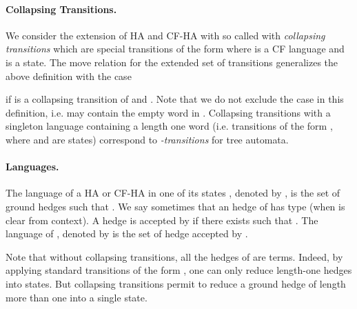 \documentclass[a4paper]{article}
\theoremstyle{plain}
\begin{document}
\paragraph{Collapsing Transitions.}
We consider the extension of HA and CF-HA with so called 
with \emph{collapsing transitions} which are special transitions of the form  
where  is a CF language and  is a state.
The move relation for the extended set of transitions
generalizes the above definition with the case

if  is a collapsing transition of  and .
Note that we do not exclude the case  in this definition,
i.e.  may contain the empty word in .
Collapsing transitions with a singleton language  containing a length one word
(i.e. transitions of the form  , where  and  are states)
correspond to \emph{-transitions} for tree automata.


\paragraph{Languages.}
The language of a HA or CF-HA  in one of its states ,
denoted by , is the set of ground hedges  
such that . 
We say sometimes that an hedge of  has type  (when  is clear from context).
A hedge is accepted by  if there exists  such that . 
The language of , denoted by   is the set of hedge accepted by . 

Note that without collapsing transitions, all the hedges of  are terms.
Indeed, by applying standard transitions of the form , 
one can only reduce length-one hedges into states.
But collapsing transitions permit to reduce a ground hedge 
of length more than one into a single state.
\end{document}
